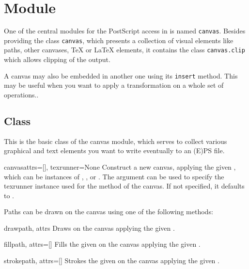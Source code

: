 \section{Module }
\label{canvas}


One of the central modules for the PostScript access in \PyX{} is
named \verb|canvas|. Besides providing the class \verb|canvas|, which
presents a collection of visual elements like paths, other canvases,
\TeX{} or \LaTeX{} elements, it contains the class
\texttt{canvas.clip} which allows clipping of the output.

A canvas may also be embedded in another one using its \texttt{insert}
method. This may be useful when you want to apply a transformation on
a whole set of operations..


\subsection{Class }

This is the basic class of the canvas module, which serves to collect
various graphical and text elements you want to write eventually to an
(E)PS file.

\begin{classdesc}{canvas}{attrs=[], texrunner=None}
  Construct a new canvas, applying the given , which can be
  instances of , ,
   or .  The
   argument can be used to specify the texrunner
  instance used for the  method of the canvas.  If not
  specified, it defaults to .
\end{classdesc}


Paths can be drawn on the canvas using one of the following methods:

\begin{methoddesc}{draw}{path, attrs}
  Draws  on the canvas applying the given .
\end{methoddesc}

\begin{methoddesc}{fill}{path, attrs=[]}
  Fills the given  on the canvas applying the given
  . 
\end{methoddesc}

\begin{methoddesc}{stroke}{path, attrs=[]}
  Strokes the given  on the canvas applying the given
  .
\end{methoddesc}


